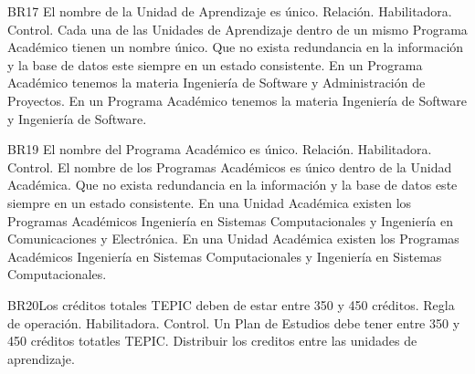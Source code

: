 \begin{BussinesRule}{BR17} {El nombre de la Unidad de Aprendizaje es único.}
    \BRitem[Tipo: ]Relación.
    \BRitem[Clase: ]Habilitadora.
    \BRitem[Nivel: ]Control.
    \BRitem[Descripción: ]Cada  una de las Unidades de Aprendizaje dentro de un mismo Programa Académico tienen un nombre único.
    \BRitem[Motivación: ] Que no exista redundancia en la información y la base de datos este siempre en un estado consistente.
     En un Programa Académico  tenemos la materia Ingeniería de Software y Administración de Proyectos.
    En un Programa Académico  tenemos la materia Ingeniería de Software y  Ingeniería de Software.
\end{BussinesRule}
\begin{BussinesRule}{BR19} {El nombre del Programa Académico es único.}
    \BRitem[Tipo: ]Relación.
    \BRitem[Clase: ]Habilitadora.
    \BRitem[Nivel: ]Control.
    \BRitem[Descripción: ]El nombre de los Programas Académicos es único dentro de la Unidad Académica.
    \BRitem[Motivación: ] Que no exista redundancia en la información y la base de datos este siempre en un estado consistente.
     En una Unidad Académica existen los Programas Académicos Ingeniería en Sistemas Computacionales y Ingeniería en Comunicaciones y Electrónica.
    En una Unidad Académica existen los Programas Académicos Ingeniería en Sistemas Computacionales y Ingeniería en Sistemas Computacionales.
\end{BussinesRule}
 \begin{BussinesRule}{BR20}{Los créditos totales TEPIC deben de estar entre 350 y 450 créditos.}
     \BRitem[Tipo: ]Regla de operación.
     \BRitem[Clase: ]Habilitadora.
     \BRitem[Nivel: ]Control.
     \BRitem[Descripción: ]Un Plan de Estudios debe tener entre 350 y 450 créditos totatles TEPIC.
     \BRitem[Motivación:] Distribuir los creditos entre las unidades de aprendizaje.
 \end{BussinesRule}
